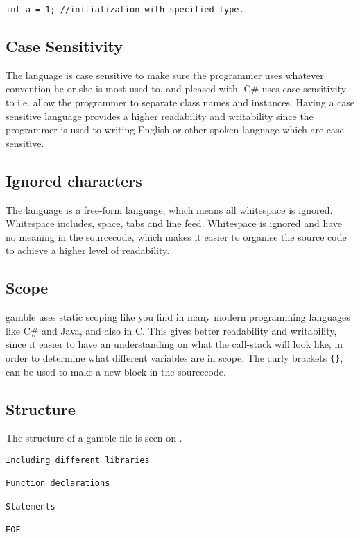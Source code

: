 \begin{lstlisting}[caption={Comment and Semicolon},label={lst:CommSemi}]
int a = 1; //initialization with specified type.
\end{lstlisting}

\subsection*{Case Sensitivity}
The language is case sensitive to make sure the programmer uses whatever convention he or she is most used to, and pleased with.
C\# uses case sensitivity to i.e. allow the programmer to separate class names and instances.
Having a case sensitive language provides a higher readability and writability since the programmer is used to writing English or other spoken language which are case sensitive.

\subsection*{Ignored characters}
The language is a free-form language, which means all whitespace is ignored.
Whitespace includes, space, tabs and line feed.
Whitespace is ignored and have no meaning in the sourcecode, which makes it easier to organise the source code to achieve a higher level of readability.

\subsection*{Scope}
\gls{gamble} uses static scoping like you find in many modern programming languages like C\# and Java, and also in C.
This gives better readability and writability, since it easier to have an understanding on what the call-stack will look like, in order to determine what different variables are in scope.
The curly brackets \texttt{\{\}}, can be used to make a new block in the sourcecode.

\subsection*{Structure} 
The structure of a \gls{gamble} file is seen on .

\begin{lstlisting}[caption={The structure of GABMLE files},label={lst:Structure}]
Including different libraries

Function declarations

Statements

EOF
\end{lstlisting}


